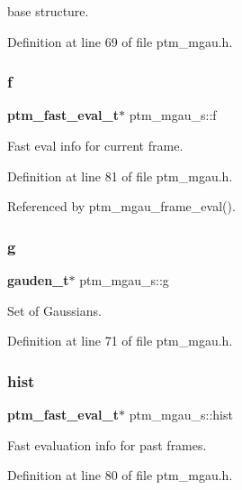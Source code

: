 base structure. 



Definition at line 69 of file ptm\+\_\+mgau.\+h.

\mbox{\label{structptm__mgau__s_aad0c43234e33c2307ce0df2ddb1c05c9}} 
\subsubsection{f}
{\footnotesize\ttfamily \textbf{ ptm\+\_\+fast\+\_\+eval\+\_\+t}$\ast$ ptm\+\_\+mgau\+\_\+s\+::f}



Fast eval info for current frame. 



Definition at line 81 of file ptm\+\_\+mgau.\+h.



Referenced by ptm\+\_\+mgau\+\_\+frame\+\_\+eval().

\mbox{\label{structptm__mgau__s_adfba8a590e8d71812ea8082f485e7ad3}} 
\subsubsection{g}
{\footnotesize\ttfamily \textbf{ gauden\+\_\+t}$\ast$ ptm\+\_\+mgau\+\_\+s\+::g}



Set of Gaussians. 



Definition at line 71 of file ptm\+\_\+mgau.\+h.

\mbox{\label{structptm__mgau__s_a68c75460ebffecc786d7eb2840ed7631}} 
\subsubsection{hist}
{\footnotesize\ttfamily \textbf{ ptm\+\_\+fast\+\_\+eval\+\_\+t}$\ast$ ptm\+\_\+mgau\+\_\+s\+::hist}



Fast evaluation info for past frames. 



Definition at line 80 of file ptm\+\_\+mgau.\+h.




